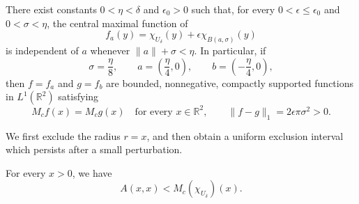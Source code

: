 \documentclass[12pt]{amsart}
\numberwithin{equation}{section}
\begin{document}
\begin{theorem}
\label{two_dimensional_theorem}
There exist constants $0<\eta<\delta$ and $\epsilon_0>0$ such that,
for every $0<\epsilon\leq\epsilon_0$ and $0<\sigma<\eta$, the central
maximal function of
\[
f_a(y)=\chi_{U_\delta}(y)+\epsilon\chi_{B(a,\sigma)}(y)
\]
is independent of $a$ whenever $\|a\|+\sigma<\eta$.
In particular, if
\[
\sigma=\frac{\eta}{8},\qquad
 a=\left(\frac{\eta}{4},0\right),\qquad
 b=\left(-\frac{\eta}{4},0\right),
\]
then $f=f_a$ and $g=f_b$ are bounded, nonnegative, compactly supported
functions in $L^1(\mathbb{R}^2)$ satisfying
\[
M_cf(x)=M_cg(x)\quad\text{for every }x\in\mathbb{R}^2,
\qquad \|f-g\|_1=2\epsilon\pi\sigma^2>0.
\]
\end{theorem}

We first exclude the radius $r=x$, and then obtain a uniform exclusion
interval which persists after a small perturbation.

\begin{lemma}
\label{two_dimensional_diagonal_gap}
For every $x>0$, we have
\begin{equation}
\label{two_dimensional_strict_gap}
A(x,x)<M_c(\chi_{U_\delta})(x).
\end{equation}
\end{lemma}
\end{document}
